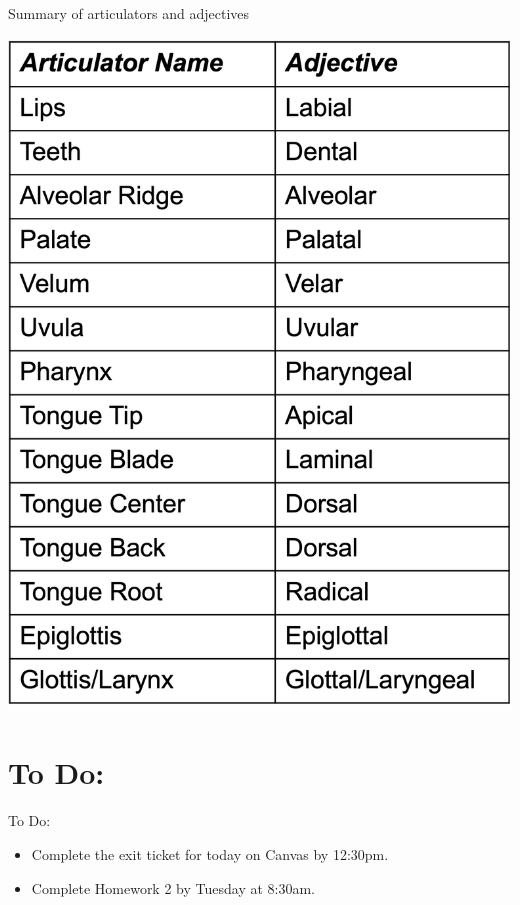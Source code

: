 \documentclass[professionalfonts]{beamer}
\begin{document}
\begin{frame}{Summary of articulators and adjectives}

    \begin{center}
        \includegraphics[width = 0.45\linewidth]{figs/Terminology.png}
    \end{center}

\end{frame}

\section*{To Do:}
\begin{frame}{To Do:}
    \begin{itemize}
        \item Complete the exit ticket for today on Canvas by 12:30pm.
        \item Complete Homework 2 by Tuesday at 8:30am.
    \end{itemize}
\end{frame}

\end{document}
